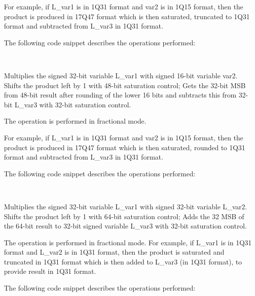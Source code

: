 For example, if L\_var1 is in 1Q31 format and var2 is in 1Q15 format, then the product is produced in 17Q47 format which is then saturated, truncated to 1Q31 format and subtracted from L\_var3 in 1Q31 format.

The following code snippet describes the operations performed:

\\


Multiplies the signed 32-bit variable L\_var1 with signed 16-bit variable var2.
Shifts the product left by 1 with 48-bit saturation control; Gets the 32-bit MSB from 48-bit result after rounding of the lower 16 bits and subtracts this from 32-bit L\_var3 with 32-bit saturation control.

The operation is performed in fractional mode.

For example, if L\_var1 is in 1Q31 format and var2 is in 1Q15 format, then the product is produced in 17Q47 format which is then saturated, rounded to 1Q31 format and subtracted from L\_var3 in 1Q31 format.

The following code snippet describes the operations performed:

\\


Multiplies the signed 32-bit variable L\_var1 with signed 32-bit variable L\_var2.
Shifts the product left by 1 with 64-bit saturation control; Adds the 32 MSB of the 64-bit result to 32-bit signed variable L\_var3 with 32-bit saturation control.

The operation is performed in fractional mode.
For example, if L\_var1 is in 1Q31 format and L\_var2 is in 1Q31 format, then the product is saturated and truncated in 1Q31 format which is then added to L\_var3 (in 1Q31 format), to provide result in 1Q31 format.

The following code snippet describes the operations performed:

\\

